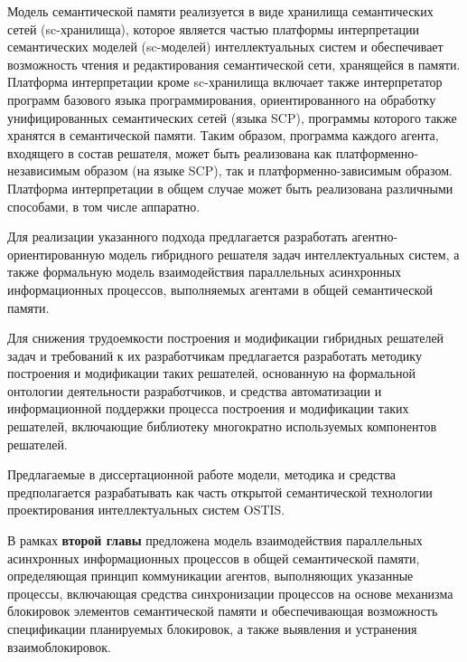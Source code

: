 \documentclass{thesisby}
\begin{document}
Модель семантической памяти реализуется в виде хранилища семантических сетей (sc-хранилища), которое является частью платформы интерпретации семантических моделей (sc-моделей) интеллектуальных систем и обеспечивает возможность чтения и редактирования семантической сети, хранящейся в памяти. Платформа интерпретации кроме sc-хранилища включает также интерпретатор программ базового языка программирования, ориентированного на обработку унифицированных семантических сетей (языка SCP), программы которого также хранятся в семантической памяти. Таким образом, программа каждого агента, входящего в состав решателя, может быть реализована как платформенно-независимым образом (на языке SCP), так и платформенно-зависимым образом. Платформа интерпретации в общем случае может быть реализована различными способами, в том числе аппаратно.

Для реализации указанного подхода предлагается разработать агентно-ориентированную модель гибридного решателя задач интеллектуальных систем, а также формальную модель взаимодействия параллельных асинхронных информационных процессов, выполняемых агентами в общей семантической памяти.

Для снижения трудоемкости построения и модификации гибридных решателей задач и требований к их разработчикам предлагается разработать методику построения и модификации таких решателей, основанную на формальной онтологии деятельности разработчиков, и средства автоматизации и информационной поддержки процесса построения и модификации таких решателей, включающие библиотеку многократно используемых компонентов решателей. 

Предлагаемые в диссертационной работе модели, методика и средства предполагается разрабатывать как часть открытой семантической технологии проектирования интеллектуальных систем OSTIS.

\iffalse
\begin{figure}[H]
  \centering
  \texttt{[image: man-source/images/ch1/pic1\_4\_left.png]}
  \caption{Структура диссертационной работы}
  \label{fig:pic1_4}
\end{figure}
\fi

В рамках \textbf{второй главы} предложена модель взаимодействия параллельных асинхронных информационных процессов в общей семантической памяти, определяющая принцип коммуникации агентов, выполняющих указанные процессы, включающая средства синхронизации процессов на основе механизма блокировок элементов семантической памяти и обеспечивающая возможность спецификации планируемых блокировок, а также выявления и устранения взаимоблокировок.
\end{document}
